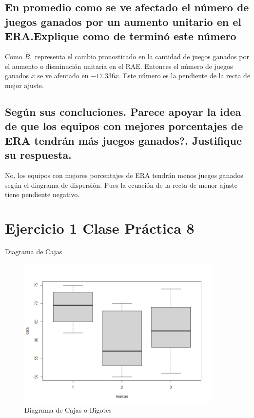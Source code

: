 \documentclass{article}
\begin{document}
			
		

		\subsection*{En promedio como se ve afectado el n\'umero de juegos ganados por un aumento unitario en el ERA.Explique como de termin\'o este n\'umero}

		\begin{flushleft}
			Como $\hat B_{1}$ representa el cambio pronosticado en la cantidad de juegos ganados por el aumento o disminuci\'on unitaria en el RAE. Entonces el n\'umero de juegos ganados $x$ se ve afentado en $-17.336 x$. Este n\'umero es la pendiente de la recta de mejor ajuste.
		\end{flushleft}

		\subsection*{Seg\'un sus concluciones. \textquestiondown Parece apoyar la idea de que los equipos con mejores porcentajes de ERA tendr\'an m\'as juegos ganados?. Justifique su respuesta. }

		\begin{flushleft}
			No, los equipos con mejores porcentajes de ERA tendr\'an menos juegos ganados seg\'un el diagrama de dispersi\'on. Pues la ecuaci\'on de la recta de menor ajuste tiene pendiente negativo.
		\end{flushleft}
		
		
		\section*{Ejercicio 1 Clase Pr\'actica 8}
		
		\begin{flushleft}
			Diagrama de Cajas
		\end{flushleft}
		
		\begin{figure}[H]
			\centering
			\includegraphics[width=0.9\textwidth]{img/ej1cp8-diagramadecajas.png}
			\caption{Diagrama de Cajas o Bigotes}
			\label{fig:ejemplo}
		\end{figure}
		
\end{document}
